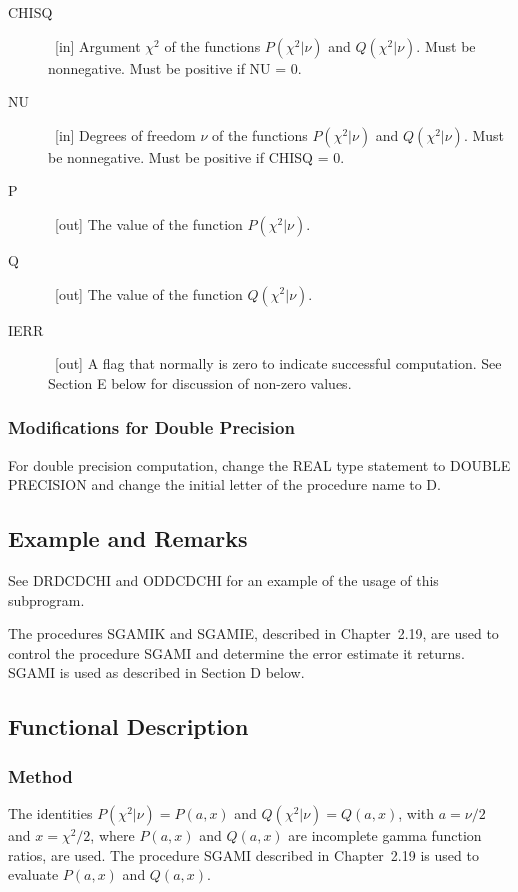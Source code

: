 \documentclass[twoside]{MATH77}
\begin{document}
\begin{description}
\item[CHISQ]  \ [in] Argument $\chi ^2$ of the functions $P(\chi ^2|\nu )$
and $Q(\chi ^2|\nu ).$  Must be nonnegative.  Must be positive if NU = 0.

\item[NU]  \ [in] Degrees of freedom $\nu $ of the functions $P(\chi ^2|\nu )
$ and $Q(\chi ^2|\nu ).$  Must be nonnegative.  Must be positive if
CHISQ = 0.

\item[P]  \ [out] The value of the function $P(\chi ^2|\nu ).$

\item[Q]  \ [out] The value of the function $Q(\chi ^2|\nu ).$

\item[IERR]  \ [out] A flag that normally is zero to indicate successful
computation. See Section E below for discussion of non-zero values.
\end{description}

\subsubsection{Modifications for Double Precision}

For double precision computation, change the REAL type statement to DOUBLE
PRECISION and change the initial letter of the procedure name to D.

\subsection{Example and Remarks}

See DRDCDCHI and ODDCDCHI for an example of the usage of this subprogram.

The procedures SGAMIK and SGAMIE, described in Chapter~2.19, are used to
control the procedure SGAMI and determine the error estimate it returns.
SGAMI is used as described in Section D below.

\subsection{Functional Description}

\subsubsection{Method}

The identities $P(\chi ^2|\nu ) = P(a,x)$ and $Q(\chi ^2|\nu ) = Q(a,x)$,
with $a = \nu /2$ and $x = \chi ^2/2$, where $P(a,x)$ and $Q(a,x)$ are
incomplete gamma function ratios, are used. The procedure SGAMI described in
Chapter~2.19 is used to evaluate $P(a,x)$ and $Q(a,x).$
\end{document}
